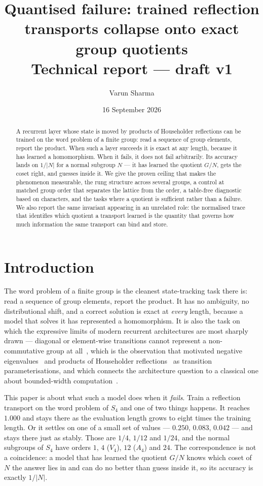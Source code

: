 \documentclass[10pt]{article}
\title{\textbf{Quantised failure: trained reflection transports collapse onto exact group quotients}\\[4pt]
\large Technical report --- draft v1}
\author{Varun Sharma}
\date{16 September 2026}
\providecommand{\citep}{\cite}
\begin{document}
\maketitle

\begin{abstract}
A recurrent layer whose state is moved by products of Householder reflections can be trained on the
word problem of a finite group: read a sequence of group elements, report the product. When such a
layer succeeds it is exact at any length, because it has learned a homomorphism. When it fails, it
does not fail arbitrarily. Its accuracy lands on $1/|N|$ for a normal subgroup $N$ --- it has learned
the quotient $G/N$, gets the coset right, and guesses inside it. We give the proven ceiling that
makes the phenomenon measurable, the rung structure across several groups, a control at matched group
order that separates the lattice from the order, a table-free diagnostic based on characters, and the
tasks where a quotient is sufficient rather than a failure. We also report the same invariant
appearing in an unrelated role: the normalised trace that identifies which quotient a transport
learned is the quantity that governs how much information the same transport can bind and store.
\end{abstract}

\section{Introduction}

The word problem of a finite group is the cleanest state-tracking task there is: read a sequence of
group elements, report the product. It has no ambiguity, no distributional shift, and a correct
solution is exact at \emph{every} length, because a model that solves it has represented a
homomorphism. It is also the task on which the expressive limits of modern recurrent architectures
are most sharply drawn --- diagonal or element-wise transitions cannot represent a non-commutative
group at all~\citep{merrill2024,sarrof2024}, which is the observation that motivated negative
eigenvalues~\citep{grazzi2024} and products of Householder reflections~\citep{siems2025} as
transition parameterisations, and which connects the architecture question to a classical one about
bounded-width computation~\citep{barrington1986}.

This paper is about what such a model does when it \emph{fails}. Train a reflection transport on the
word problem of $S_4$ and one of two things happens. It reaches $1.000$ and stays there as the
evaluation length grows to eight times the training length. Or it settles on one of a small set of
values --- $0.250$, $0.083$, $0.042$ --- and stays there just as stably. Those are $1/4$, $1/12$ and
$1/24$, and the normal subgroups of $S_4$ have orders $1$, $4$ ($V_4$), $12$ ($A_4$) and $24$. The
correspondence is not a coincidence: a model that has learned the quotient $G/N$ knows which coset of
$N$ the answer lies in and can do no better than guess inside it, so its accuracy is exactly $1/|N|$.
\end{document}
